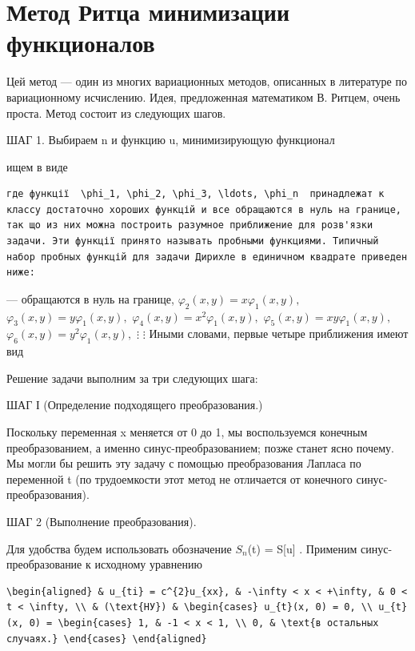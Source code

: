 \documentclass[
  ukrainian,
]{article}
\begin{document}
\section{Метод Ритца минимизации
функционалов}\label{ux43cux435ux442ux43eux434-ux440ux438ux442ux446ux430-ux43cux438ux43dux438ux43cux438ux437ux430ux446ux438ux438-ux444ux443ux43dux43aux446ux438ux43eux43dux430ux43bux43eux432}

Цей метод --- один из многих вариационных методов, описанных в
литературе по вариационному исчислению. Идея, предложенная математиком
В. Ритцем, очень проста. Метод состоит из следующих шагов.

ШАГ 1. Выбираем n и функцию u, минимизирующую функционал

ищем в виде

\begin{verbatim}
где функції  \phi_1, \phi_2, \phi_3, \ldots, \phi_n  принадлежат к классу достаточно хороших функцій и все обращаются в нуль на границе, так що из них можна построить разумное приближение для розв'язки задачи. Эти функції принято называть пробными функциями. Типичный набор пробных функцій для задачи Дирихле в единичном квадрате приведен ниже:
\end{verbatim}

--- обращаются в нуль на границе,
\(\varphi_2(x, y) = x\varphi_1(x, y),\)
\(\varphi_3(x, y) = y\varphi_1(x, y),\)
\(\varphi_4(x, y) = x^2\varphi_1(x, y),\)
\(\varphi_5(x, y) = xy\varphi_1(x, y),\)
\(\varphi_6(x, y) = y^2\varphi_1(x, y),\) \(\vdots\) \(\vdots\) Иными
словами, первые четыре приближения имеют вид

Решение задачи выполним за три следующих шага:

ШАГ І (Определение подходящего преобразования.)

Поскольку переменная x меняется от 0 до 1, мы воспользуемся конечным
преобразованием, а именно синус-преобразованием; позже станет ясно
почему. Мы могли бы решить эту задачу с помощью преобразования Лапласа
по переменной t (по трудоемкости этот метод не отличается от конечного
синус-преобразования).

ШАГ 2 (Выполнение преобразования).

Для удобства будем использовать обозначение \(S_n\)(t) = S{[}u{]} .
Применим синус-преобразование к исходному уравнению

\begin{verbatim}
\begin{aligned} & u_{ti} = c^{2}u_{xx}, & -\infty < x < +\infty, & 0 < t < \infty, \\ & (\text{НУ}) & \begin{cases} u_{t}(x, 0) = 0, \\ u_{t}(x, 0) = \begin{cases} 1, & -1 < x < 1, \\ 0, & \text{в остальных случаях.} \end{cases} \end{aligned}
\end{verbatim}
\end{document}
